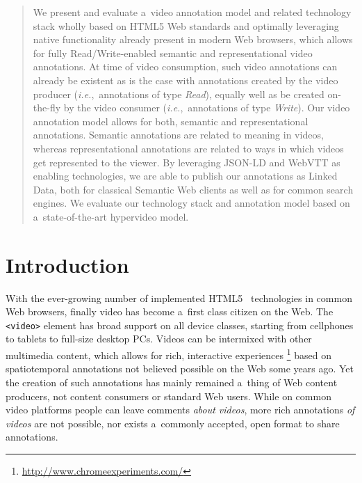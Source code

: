 \documentclass{sig-alternate}
\newcommand{\inlinelistingsize}{\fontsize{8pt}{11pt}}
\let\oldurl\url
\renewcommand{\url}[1]{\inlinelistingsize\oldurl{#1}}
\newcommand{\todo}[1]{\fcolorbox{blue}{white}{\parbox{7cm}{\color{blue}{#1}}}}
\begin{document}
\maketitle
\begin{abstract}
We present and evaluate
a~video annotation model and related technology stack
wholly based on HTML5 Web standards
and optimally leveraging native functionality
already present in modern Web browsers,
which allows for fully Read/Write-enabled
semantic and representational video annotations.
At time of video consumption, such video annotations
can already be existent as is the case
with annotations created by the video producer
(\emph{i.e.},~annotations of type \emph{Read}),
equally well as be created on-the-fly by the video consumer
(\emph{i.e.},~annotations of type \emph{Write}).
Our video annotation model allows for both,
semantic and representational annotations.
Semantic annotations are related to meaning in videos,
whereas representational annotations are related to
ways in which videos get represented to the viewer.
By leveraging JSON-LD and WebVTT as enabling technologies,
we are able to publish our annotations as Linked Data,
both for classical Semantic Web clients
as well as for common search engines.
We evaluate our technology stack and annotation model
based on a~state-of-the-art hypervideo model.
\end{abstract}

\category{ToDo}{\todo{category}}{}

\terms{\todo{terms}}

\keywords{\todo{keywords}}

\section{Introduction}

With the ever-growing number of implemented HTML5~\cite{berjon2013html5}
technologies in common Web browsers,
finally video has become a~first class citizen on the Web.
The \texttt{<video>} element has broad support
on all device classes,
starting from cellphones to tablets to full-size desktop PCs.
Videos can be intermixed with other multimedia content,
which allows for rich, interactive experiences%
\footnote{\url{http://www.chromeexperiments.com/}}
based on spatiotemporal annotations
not believed possible on the Web some years ago.
Yet the creation of such annotations
has mainly remained a~thing of Web content producers,
not content consumers or standard Web users.
While on common video platforms people
can leave comments \emph{about videos},
more rich annotations \emph{of videos} are not possible,
nor exists a~commonly accepted, open format to share annotations.
\end{document}
